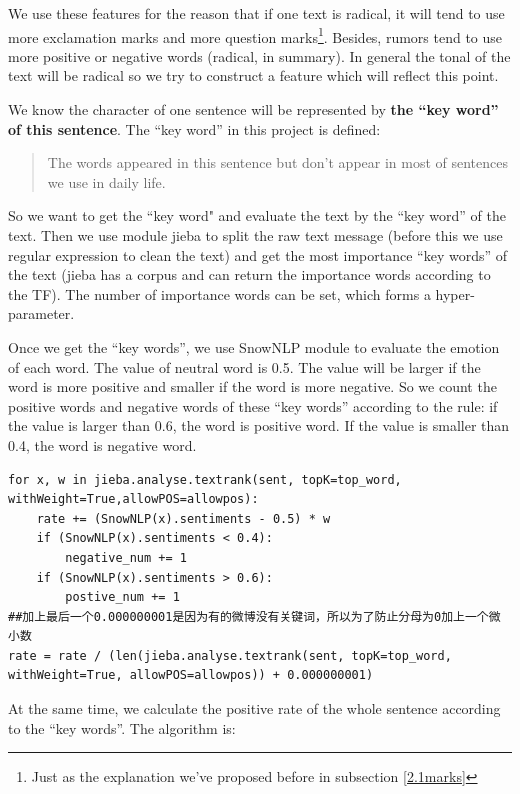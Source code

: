 \documentclass[12pt,a4paper]{article}
\begin{document}
\setlength{\parindent}{2em}
We use these features for the reason that if one text is radical, it will tend to use more exclamation marks and more question marks\footnote{Just as the explanation we've proposed before in subsection \ref{2.1marks}}. Besides, rumors tend to use more positive or negative words (radical, in summary). In general the tonal of the text will be radical so we try to construct a feature which will reflect this point. 

We know the character of one sentence will be represented by \textbf{the ``key word'' of this sentence}. The ``key word'' in this project is defined:

\begin{quotation}
	The words appeared in this sentence but don't appear in most of sentences we use in daily life.
\end{quotation}

So we want to get the ``key word" and evaluate the text by the ``key word'' of the text. Then we use module jieba to split the raw text message (before this we use regular expression to clean the text) and get the most importance ``key words'' of the text (jieba has a corpus and can return the importance words according to the TF). The number of importance words can be set, which forms a hyper-parameter. 

Once we get the ``key words'', we use SnowNLP module to evaluate the emotion of each word. The value of neutral word is 0.5. The value will be larger if the word is more positive and smaller if the word is more negative. So we count the positive words and negative words of these ``key words'' according to the rule: if the value is larger than 0.6, the word is positive word. If the value is smaller than 0.4, the word is negative word.

\begin{lstlisting}
for x, w in jieba.analyse.textrank(sent, topK=top_word, withWeight=True,allowPOS=allowpos):
	rate += (SnowNLP(x).sentiments - 0.5) * w
	if (SnowNLP(x).sentiments < 0.4):
		negative_num += 1
	if (SnowNLP(x).sentiments > 0.6):
		postive_num += 1
##加上最后一个0.000000001是因为有的微博没有关键词，所以为了防止分母为0加上一个微小数
rate = rate / (len(jieba.analyse.textrank(sent, topK=top_word, withWeight=True, allowPOS=allowpos)) + 0.000000001)
\end{lstlisting}

At the same time, we calculate the positive rate of the whole sentence according to the ``key words''. The algorithm is:
\end{document}
